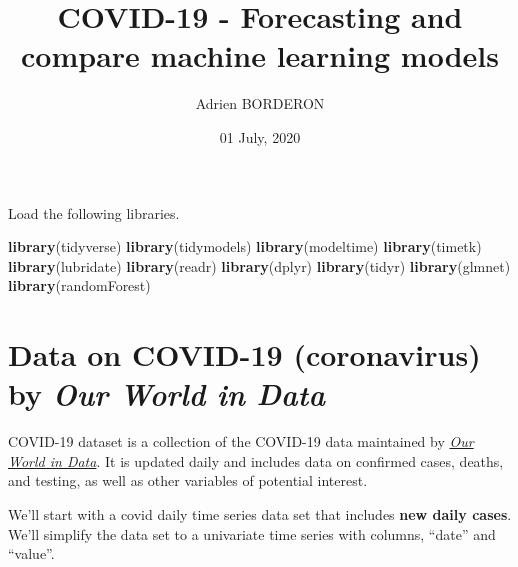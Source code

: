 \documentclass[
]{article}
\title{COVID-19 - Forecasting and compare machine learning models}
\author{Adrien BORDERON}
\date{01 July, 2020}
\newenvironment{Shaded}{\begin{snugshade}}{\end{snugshade}}
\newcommand{\KeywordTok}[1]{\textcolor[rgb]{0.13,0.29,0.53}{\textbf{#1}}}
\newcommand{\NormalTok}[1]{#1}
\begin{document}
\maketitle

Load the following libraries.

\begin{Shaded}
\begin{Highlighting}[]
\KeywordTok{library}\NormalTok{(tidyverse)}
\KeywordTok{library}\NormalTok{(tidymodels)}
\KeywordTok{library}\NormalTok{(modeltime)}
\KeywordTok{library}\NormalTok{(timetk)   }
\KeywordTok{library}\NormalTok{(lubridate)}
\KeywordTok{library}\NormalTok{(readr)}
\KeywordTok{library}\NormalTok{(dplyr)}
\KeywordTok{library}\NormalTok{(tidyr)}
\KeywordTok{library}\NormalTok{(glmnet)}
\KeywordTok{library}\NormalTok{(randomForest)}
\end{Highlighting}
\end{Shaded}

\hypertarget{data-on-covid-19-coronavirus-by-our-world-in-data}{%
\section{\texorpdfstring{Data on COVID-19 (coronavirus) by \emph{Our
World in
Data}}{Data on COVID-19 (coronavirus) by Our World in Data}}\label{data-on-covid-19-coronavirus-by-our-world-in-data}}

COVID-19 dataset is a collection of the COVID-19 data maintained by
\href{https://ourworldindata.org/coronavirus}{\emph{Our World in Data}}.
It is updated daily and includes data on confirmed cases, deaths, and
testing, as well as other variables of potential interest.

We'll start with a covid daily time series data set that includes
\textbf{new daily cases}. We'll simplify the data set to a univariate
time series with columns, ``date'' and ``value''.
\end{document}
